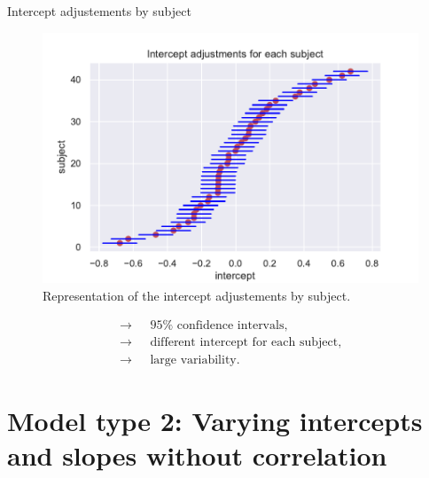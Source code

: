 \documentclass[unknownkeysallowed]{beamer}
\begin{document}
\begin{frame}{Intercept adjustements by subject}
\begin{figure}[H]
    \centering
    \includegraphics[scale=.45]{./images/model1_inter.pdf}
    \caption{Representation of the intercept adjustements by subject.}
\end{figure}
\vspace{-0.3cm}
\begin{align*}
    \longrightarrow \text{ }& 95\% \text{ confidence intervals},\\
    \longrightarrow \text{ }& \text{different intercept for each subject},\\
    \longrightarrow \text{ }& \text{large variability}.
\end{align*}
\end{frame}


\section{Model type 2: Varying intercepts and slopes without correlation}
\end{document}
